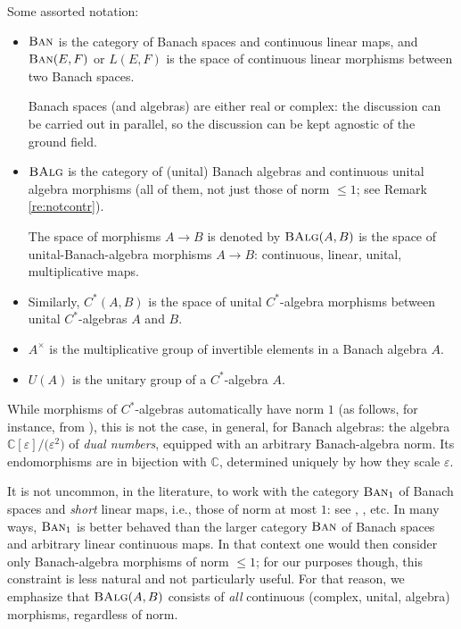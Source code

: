 \documentclass[pdftex]{sigma}
\numberwithin{equation}{section}
\newcommand\bC{{\mathbb C}}
\newcommand{\cat}[1]{\text{\sc #1}}
\begin{document}
Some assorted notation:
\begin{itemize}\itemsep=0pt
\item $\cat{Ban}$ is the category of Banach spaces and continuous linear maps, and $\cat{Ban}(E,F)$ or $L(E,F)$ is the space of continuous linear morphisms between two Banach spaces.

 Banach spaces (and algebras) are either real or complex: the discussion can be carried out in parallel, so the discussion can be kept agnostic of the ground field.

\item $\cat{BAlg}$ is the category of (unital) Banach algebras and continuous unital algebra morphisms (all of them, not just those of norm $\le 1$; see Remark \ref{re:notcontr}).

 The space of morphisms $A\to B$ is denoted by $\cat{BAlg}(A,B)$ is the space of unital-Banach-algebra morphisms $A\to B$: continuous, linear, unital, multiplicative maps.
\item Similarly, $C^*(A,B)$ is the space of unital $C^*$-algebra morphisms between unital $C^*$-al\-ge\-bras $A$ and $B$.
\item $A^{\times}$ is the multiplicative group of invertible elements in a Banach algebra $A$.
\item $U(A)$ is the unitary group of a $C^*$-algebra $A$.
\end{itemize}

\begin{Remark}\label{re:notcontr}
 While morphisms of $C^*$-algebras automatically have norm $1$ (as follows, for instance, from \cite[Proposition 1.6.2]{arv}), this is not the case, in general, for Banach algebras: the algebra $\bC[\varepsilon]/\big(\varepsilon^2\big)$ of {\it dual numbers}, equipped with an arbitrary Banach-algebra norm. Its endomorphisms are in bijection with $\bC$, determined uniquely by how they scale $\varepsilon$.

 It is not uncommon, in the literature, to work with the category $\cat{Ban}_1$ of Banach spaces and {\it short} linear maps, i.e., those of norm at most $1$: see \cite[Example 1.48]{ar}, \cite{poth}, etc. In many ways, $\cat{Ban}_1$ is better behaved than the larger category $\cat{Ban}$ of Banach spaces and arbitrary linear continuous maps. In that context one would then consider only Banach-algebra morphisms of norm $\le 1$; for our purposes though, this constraint is less natural and not particularly useful. For that reason, we emphasize that $\cat{BAlg}(A,B)$ consists of {\it all} continuous (complex, unital, algebra) morphisms, regardless of norm.
\end{Remark}
\end{document}
